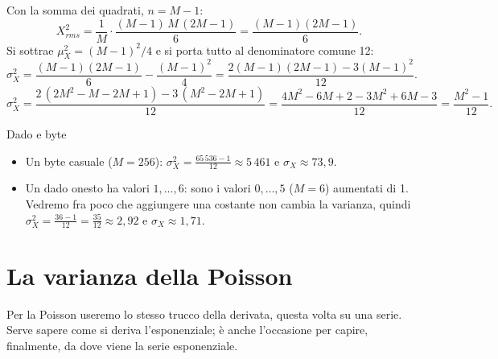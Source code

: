 
\begin{dimostrazione}
 Con la somma dei quadrati, $n = M - 1$:
\[ X_{rms}^2 = \frac{1}{M} \cdot \frac{(M-1)\,M\,(2M-1)}{6} = \frac{(M-1)(2M-1)}{6} . \]
 Si sottrae $\mu_X^2 = (M-1)^2/4$ e si porta tutto al denominatore comune 12:
\[
  \sigma_X^2 = \frac{(M-1)(2M-1)}{6} - \frac{(M-1)^2}{4} = \frac{2(M-1)(2M-1) - 3(M-1)^2}{12} .
\]
\[
  \sigma_X^2 = \frac{2\,(2M^2 - M - 2M + 1) - 3\,(M^2 - 2M + 1)}{12}
  = \frac{4M^2 - 6M + 2 - 3M^2 + 6M - 3}{12} = \frac{M^2 - 1}{12} .
\]
\end{dimostrazione}

\begin{esempio}{Dado e byte}
\begin{itemize}
  \item Un byte casuale ($M = 256$): $\sigma_X^2 = \frac{65\,536 - 1}{12} \approx 5\,461$ e $\sigma_X \approx 73{,}9$.
  \item Un dado onesto ha valori $1, \ldots, 6$: sono i valori $0, \ldots, 5$ ($M = 6$) aumentati di 1. Vedremo fra
        poco che aggiungere una costante non cambia la varianza, quindi $\sigma_X^2 = \frac{36 - 1}{12} = \frac{35}{12}
        \approx 2{,}92$ e $\sigma_X \approx 1{,}71$.
\end{itemize}
\end{esempio}

\section{La varianza della Poisson}

Per la Poisson useremo lo stesso trucco della derivata, questa volta su una serie. Serve sapere come si deriva
l'esponenziale; è anche l'occasione per capire, finalmente, da dove viene la serie esponenziale.

